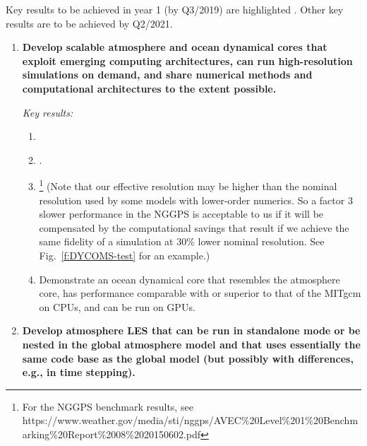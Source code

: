 \documentclass{article}
\begin{document}
Key results to be achieved in year 1 (by Q3/2019) are highlighted . Other key results are to be achieved by Q2/2021.    
\begin{enumerate}
    \item \textbf{Develop scalable atmosphere and ocean dynamical cores that exploit emerging computing architectures, can run high-resolution simulations on demand, and share numerical methods and computational architectures to the extent possible.}
        
    \emph{Key results:}
    \begin{enumerate}
        \item {}
        \item {} \citep{abdi:2016b,abdi:2018,mueller:2016}. 
        \item {}\footnote{For the NGGPS benchmark results, see https://www.weather.gov/media/sti/nggps/AVEC\%20Level\%201\%20Benchmarking\%20Report\%2008\%2020150602.pdf} (Note that our effective resolution may be higher than the nominal resolution used by some models with lower-order numerics. So a factor 3 slower performance in the NGGPS is acceptable to us if it will be compensated by the computational savings that result if we achieve the same fidelity of a simulation at 30\% lower nominal resolution. See Fig.~\ref{f:DYCOMS-test} for an example.)
        \item Demonstrate an ocean dynamical core that resembles the atmosphere core, has performance comparable with or superior to that of the MITgcm on CPUs, and can be run on GPUs.
    \end{enumerate}
 
 \item \textbf{Develop atmosphere LES that can be run in standalone mode or be nested in the global atmosphere model and that uses essentially the same code base as the global model (but possibly with differences, e.g., in time stepping).}
 

\end{enumerate}
\end{document}
